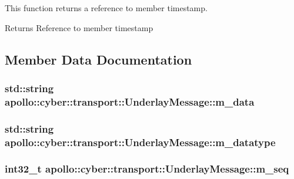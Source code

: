 This function returns a reference to member timestamp. 

\begin{DoxyReturn}{Returns}
Reference to member timestamp 
\end{DoxyReturn}


\subsection{Member Data Documentation}
\hypertarget{classapollo_1_1cyber_1_1transport_1_1UnderlayMessage_a4314a37a49dc9793a56c0f97854c348c}{
\subsubsection[{m\-\_\-data}]{\setlength{\rightskip}{0pt plus 5cm}std\-::string apollo\-::cyber\-::transport\-::\-Underlay\-Message\-::m\-\_\-data\hspace{0.3cm}{\ttfamily [private]}}}\label{classapollo_1_1cyber_1_1transport_1_1UnderlayMessage_a4314a37a49dc9793a56c0f97854c348c}
\hypertarget{classapollo_1_1cyber_1_1transport_1_1UnderlayMessage_aab0085246529a2f6585bdb589e7b8950}{
\subsubsection[{m\-\_\-datatype}]{\setlength{\rightskip}{0pt plus 5cm}std\-::string apollo\-::cyber\-::transport\-::\-Underlay\-Message\-::m\-\_\-datatype\hspace{0.3cm}{\ttfamily [private]}}}\label{classapollo_1_1cyber_1_1transport_1_1UnderlayMessage_aab0085246529a2f6585bdb589e7b8950}
\hypertarget{classapollo_1_1cyber_1_1transport_1_1UnderlayMessage_a459324259af22ad6c5e250dbd44687be}{
\subsubsection[{m\-\_\-seq}]{\setlength{\rightskip}{0pt plus 5cm}int32\-\_\-t apollo\-::cyber\-::transport\-::\-Underlay\-Message\-::m\-\_\-seq\hspace{0.3cm}{\ttfamily [private]}}}\label{classapollo_1_1cyber_1_1transport_1_1UnderlayMessage_a459324259af22ad6c5e250dbd44687be}
